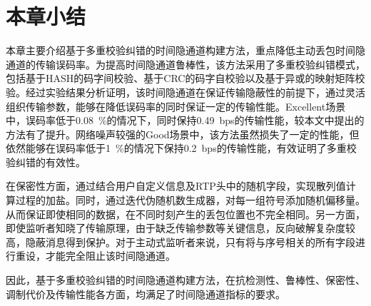 \section{本章小结}
\label{chap:hash:summary}

本章主要介绍基于多重校验纠错的时间隐通道构建方法，重点降低主动丢包时间隐通道的传输误码率。为提高时间隐通道鲁棒性，该方法采用了多重校验纠错模式，包括基于HASH的码字间校验、基于CRC的码字自校验以及基于异或的映射矩阵校验。经过实验结果分析证明，该时间隐通道在保证传输隐蔽性的前提下，通过灵活组织传输参数，能够在降低误码率的同时保证一定的传输性能。Excellent场景中，误码率低于{0.08\ \%}的情况下，同时保持{0.49\ bps}的传输性能，较本文中提出的方法有了提升。网络噪声较强的Good场景中，该方法虽然损失了一定的性能，但依然能够在误码率低于{1\ \%}的情况下保持{0.2\ bps}的传输性能，有效证明了多重校验纠错的有效性。

在保密性方面，通过结合用户自定义信息及RTP头中的随机字段，实现散列值计算过程的加盐。同时，通过迭代伪随机数生成器，对每一组符号添加随机偏移量。从而保证即使相同的数据，在不同时刻产生的丢包位置也不完全相同。另一方面，即使监听者知晓了传输原理，由于缺乏传输参数等关键信息，反向破解复杂度较高，隐蔽消息得到保护。对于主动式监听者来说，只有将与序号相关的所有字段进行重设，才能完全阻止该时间隐通道。

因此，基于多重校验纠错的时间隐通道构建方法，在抗检测性、鲁棒性、保密性、调制代价及传输性能各方面，均满足了时间隐通道指标的要求。